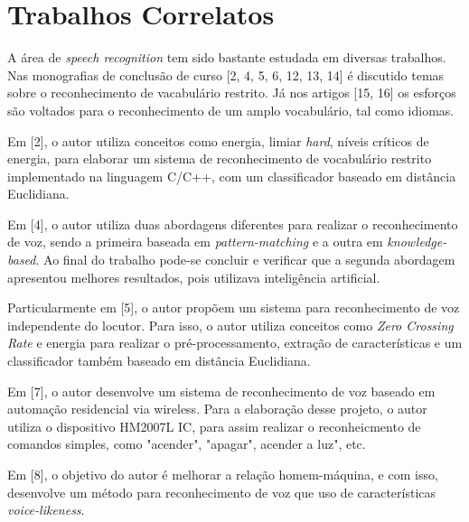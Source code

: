 \documentclass[a4paper,12pt,twoside,openright]{report}
\begin{document}
\section{Trabalhos Correlatos}
\label{trabalhos_correlatos}
\par A \'{a}rea de \textit{speech recognition} tem sido bastante estudada em diversas trabalhos. Nas monografias de conclus\~{a}o de curso [2, 4, 5, 6, 12, 13, 14] \'{e} discutido temas sobre o reconhecimento de vacabul\'{a}rio restrito. J\'{a} nos artigos [15, 16] os esfor{\c c}os s\~{a}o voltados para o reconhecimento de um amplo vocabul\'{a}rio, tal como idiomas.

\par Em [2], o autor utiliza conceitos como energia, limiar \textit{hard}, n\'{i}veis cr\'{i}ticos de energia, para elaborar um sistema  de reconhecimento de vocabul\'{a}rio restrito implementado na linguagem C/C++, com um classificador baseado em dist\^{a}ncia Euclidiana.

\par Em [4], o autor utiliza duas abordagens diferentes para realizar o reconhecimento de voz, sendo a primeira baseada em \textit{pattern-matching} e a outra em \textit{knowledge-based}. Ao final do trabalho pode-se concluir e verificar que a segunda abordagem apresentou melhores resultados, pois utilizava intelig\^{e}ncia artificial.

\par Particularmente em [5], o autor prop\~{o}em um sistema para reconhecimento de voz independente do locutor. Para isso, o autor utiliza conceitos como  \textit{Zero Crossing Rate} e energia para realizar o pr\'{e}-processamento, extra{\c c}\~{a}o de caracter\'{i}sticas e um classificador tamb\'{e}m baseado em dist\^{a}ncia Euclidiana.

\par Em [7], o autor desenvolve um sistema de reconhecimento de voz baseado em automa{\c c}\~{a}o residencial via wireless. Para a elabora{\c c}\~{a}o desse projeto, o autor utiliza o dispositivo HM2007L IC, para assim realizar o reconheicmento de comandos simples, como "acender", "apagar", acender a luz", etc.

\par Em [8], o objetivo do autor \'{e} melhorar a rela{\c c}\~{a}o homem-m\'{a}quina, e com isso, desenvolve um m\'{e}todo para reconhecimento de voz que uso de caracter\'{i}sticas \textit{voice-likeness}.
\end{document}
